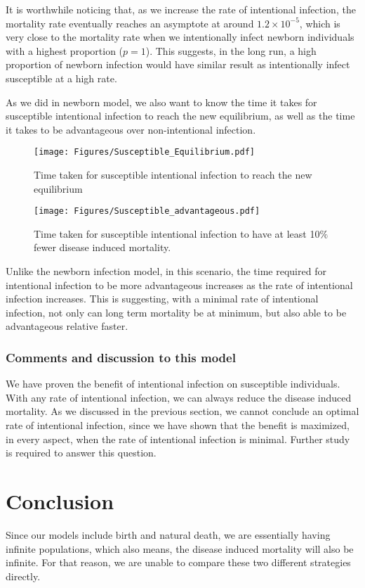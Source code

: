 \documentclass[12pt]{article}
\begin{document}
It is worthwhile noticing that, as we increase the rate of intentional infection, the mortality rate eventually reaches an asymptote at around $1.2\times10^{-5}$, which is very close to the mortality rate when we intentionally infect newborn individuals with a highest proportion ($p=1$). This suggests, in the long run, a high proportion of newborn infection would have similar result as intentionally infect susceptible at a high rate.

As we did in newborn model, we also want to know the time it takes for susceptible intentional infection to reach the new equilibrium, as well as the time it takes to be advantageous over non-intentional infection.

\begin{figure}[H]
  \centering
  \texttt{[image: Figures/Susceptible\_Equilibrium.pdf]}
  \caption{Time taken for susceptible intentional infection to reach the new equilibrium}
\end{figure}

\begin{figure}[H]
  \centering
  \texttt{[image: Figures/Susceptible\_advantageous.pdf]}
  \caption{Time taken for susceptible intentional infection to have at least 10$\%$ fewer disease induced mortality.}
\end{figure}

Unlike the newborn infection model, in this scenario, the time required for intentional infection to be more advantageous increases as the rate of intentional infection increases. This is suggesting, with a minimal rate of intentional infection, not only can long term mortality be at minimum, but also able to be advantageous relative faster.
\subsubsection{Comments and discussion to this model}
We have proven the benefit of intentional infection on susceptible individuals. With any rate of intentional infection, we can always reduce the disease induced mortality. As we discussed in the previous section, we cannot conclude an optimal rate of intentional infection, since we have shown that the benefit is maximized, in every aspect, when the rate of intentional infection is minimal. Further study is required to answer this question.
\section{Conclusion}
Since our models include birth and natural death, we are essentially having infinite populations, which also means, the disease induced mortality will also be infinite. For that reason, we are unable to compare these two different strategies directly.
\end{document}
